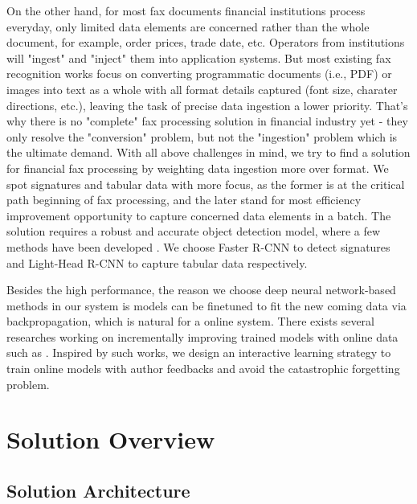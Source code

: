 \documentclass[sigconf]{acmart}
\begin{document}
On the other hand, for most fax documents financial institutions process everyday, only limited data elements are concerned rather than the whole document, for example, order prices, trade date, etc. Operators from institutions will "ingest" and "inject" them into application systems. But most existing fax recognition works focus on converting programmatic documents (i.e., PDF) or images into text as a whole with all format details captured (font size, charater directions, etc.), leaving the task of precise data ingestion a lower priority. That's why there is no "complete" fax processing solution in financial industry yet - they only resolve the "conversion" problem, but not the "ingestion" problem which is the ultimate demand. With all above challenges in mind, we try to find a solution for financial fax processing by weighting data ingestion more over format. We spot signatures and tabular data with more focus, as the former is at the critical path beginning of fax processing, and the later stand for most efficiency improvement opportunity to capture concerned data elements in a batch. The solution requires a robust and accurate object detection model, where a few methods have been developed \cite{ren2015faster, dai2016r, li2017light}. We choose Faster R-CNN \cite{ren2015faster} to detect signatures and Light-Head R-CNN \cite{li2017light} to capture tabular data respectively. 

Besides the high performance, the reason we choose deep neural network-based methods in our system is models can be finetuned to fit the new coming data via backpropagation, which is natural for a online system. There exists several researches working on incrementally improving trained models with online data such as \cite{shmelkov2017incremental, su2016line}. Inspired by such works, we design an interactive learning strategy to train online models with author feedbacks and avoid the catastrophic forgetting problem.

\section{Solution Overview}
\subsection{Solution Architecture}
\end{document}
